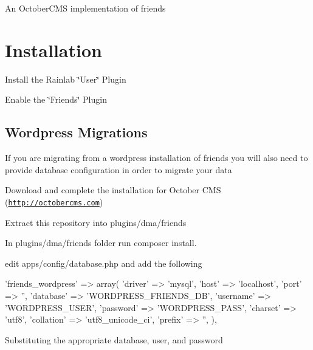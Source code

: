 An October\-C\-M\-S implementation of friends

\section*{Installation}


\begin{DoxyItemize}
\item Install the Rainlab \char`\"{}\-User\char`\"{} Plugin
\item Enable the \char`\"{}\-Friends\char`\"{} Plugin
\end{DoxyItemize}

\subsection*{Wordpress Migrations}

If you are migrating from a wordpress installation of friends you will also need to provide database configuration in order to migrate your data


\begin{DoxyItemize}
\item Download and complete the installation for October C\-M\-S (\href{http://octobercms.com}{\tt http\-://octobercms.\-com})
\item Extract this repository into plugins/dma/friends
\item In plugins/dma/friends folder run {\ttfamily composer install}.
\item edit apps/config/database.\-php and add the following 
\begin{DoxyPre}
        'friends\_wordpress' => array(
            'driver'    => 'mysql',
            'host'      => 'localhost',
            'port'      => '', 
            'database'  => 'WORDPRESS\_FRIENDS\_DB',
            'username'  => 'WORDPRESS\_USER',
            'password'  => 'WORDPRESS\_PASS',
            'charset'   => 'utf8',
            'collation' => 'utf8\_unicode\_ci',
            'prefix'    => '', 
        ), 
\end{DoxyPre}
 Substituting the appropriate database, user, and password 
\end{DoxyItemize}